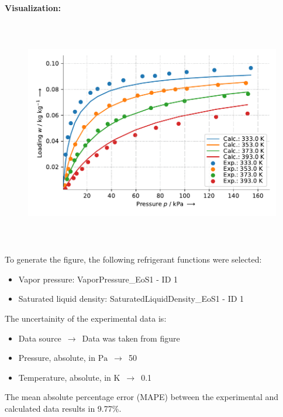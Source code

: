 \textbf{Visualization:}
%
\begin{figure}[!htp]
{\noindent\includegraphics[height=10cm, keepaspectratio]{figs/ads/ads_Propane_zeolite_pellet_13X_Toth_2.pdf}}
\end{figure}
%

To generate the figure, the following refrigerant functions were selected:
\begin{itemize}
\item Vapor pressure: VaporPressure\_EoS1 - ID 1
\item Saturated liquid density: SaturatedLiquidDensity\_EoS1 - ID 1
\end{itemize}

The uncertainity of the experimental data is:
\begin{itemize}
\item Data source $\,\to\,$ Data was taken from figure
\item Pressure, absolute, in $\si{\pascal}$ $\,\to\,$ 50
\item Temperature, absolute, in $\si{\kelvin}$ $\,\to\,$ 0.1
\end{itemize}

The mean absolute percentage error (MAPE) between the experimental and calculated data results in 9.77\%.
\FloatBarrier
\newpage
